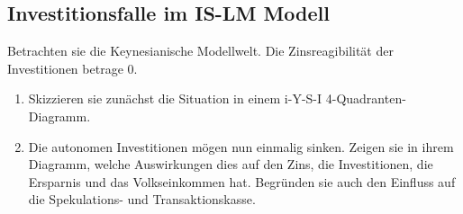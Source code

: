 \documentclass{scrartcl}
\begin{document}
\subsection{Investitionsfalle im IS-LM Modell}
Betrachten sie die Keynesianische Modellwelt. Die Zinsreagibilität der Investitionen betrage 0.
\begin{enumerate}
	\item Skizzieren sie zunächst die Situation in einem i-Y-S-I 4-Quadranten-Diagramm.
	\item Die autonomen Investitionen mögen nun einmalig sinken. Zeigen sie in ihrem Diagramm, welche Auswirkungen dies auf den Zins, die Investitionen, die Ersparnis und das Volkseinkommen hat. Begründen sie auch den Einfluss auf die Spekulations- und Transaktionskasse.
\end{enumerate}
\end{document}

